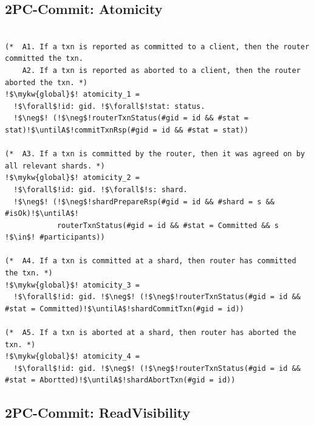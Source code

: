 \subsection{2PC-Commit: Atomicity}

\begin{verbatim}

(*  A1. If a txn is reported as committed to a client, then the router committed the txn.
    A2. If a txn is reported as aborted to a client, then the router aborted the txn. *)
!$\mykw{global}$! atomicity_1 =
  !$\forall$!id: gid. !$\forall$!stat: status.
  !$\neg$! (!$\neg$!routerTxnStatus(#gid = id && #stat = stat)!$\untilA$!commitTxnRsp(#gid = id && #stat = stat))

(*  A3. If a txn is committed by the router, then it was agreed on by all relevant shards. *)
!$\mykw{global}$! atomicity_2 =
  !$\forall$!id: gid. !$\forall$!s: shard.
  !$\neg$! (!$\neg$!shardPrepareRsp(#gid = id && #shard = s && #isOk)!$\untilA$!
            routerTxnStatus(#gid = id && #stat = Committed && s !$\in$! #participants))

(*  A4. If a txn is committed at a shard, then router has committed the txn. *)
!$\mykw{global}$! atomicity_3 =
  !$\forall$!id: gid. !$\neg$! (!$\neg$!routerTxnStatus(#gid = id && #stat = Committed)!$\untilA$!shardCommitTxn(#gid = id))

(*  A5. If a txn is aborted at a shard, then router has aborted the txn. *)
!$\mykw{global}$! atomicity_4 =
  !$\forall$!id: gid. !$\neg$! (!$\neg$!routerTxnStatus(#gid = id && #stat = Abortted)!$\untilA$!shardAbortTxn(#gid = id))
\end{verbatim}

\subsection{2PC-Commit: ReadVisibility}

